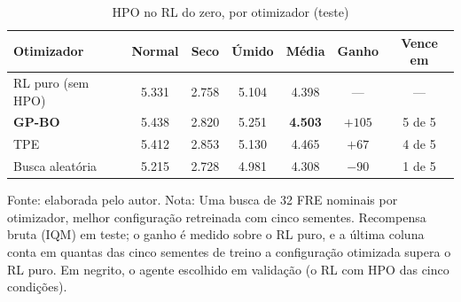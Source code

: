 \begin{table}[htbp]
\centering
\small\setlength{\tabcolsep}{3pt}
\caption{HPO no RL do zero, por otimizador (teste)}
\label{tab:otimizadores_zero}
\begin{tabular}{l c c c c c c}
\hline
\textbf{Otimizador} & \textbf{Normal} & \textbf{Seco} & \textbf{Úmido} & \textbf{Média} & \textbf{Ganho} & \textbf{Vence em} \\ \hline
RL puro (sem HPO) & 5.331 & 2.758 & 5.104 & 4.398 & --- & --- \\ \hline
\textbf{GP-BO} & 5.438 & 2.820 & 5.251 & \textbf{4.503} & $+105$ & 5 de 5 \\
TPE & 5.412 & 2.853 & 5.130 & 4.465 & $+67$ & 4 de 5 \\
Busca aleatória & 5.215 & 2.728 & 4.981 & 4.308 & $-90$ & 1 de 5 \\
\hline
\end{tabular}

{\footnotesize Fonte: elaborada pelo autor. Nota: Uma busca de 32 FRE nominais por otimizador, melhor configuração retreinada com cinco sementes. Recompensa bruta (IQM) em teste; o ganho é medido sobre o RL puro, e a última coluna conta em quantas das cinco sementes de treino a configuração otimizada supera o RL puro. Em negrito, o agente escolhido em validação (o RL com HPO das cinco condições).}
\end{table}
